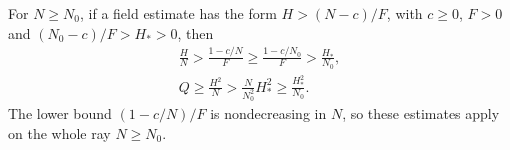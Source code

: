 For $N\ge N_0$, if a field estimate has the form $H>(N-c)/F$,
with $c\ge0$, $F>0$ and $(N_0-c)/F>H_*>0$, then
\begin{equation}\label{lt:energy-ray}
 \begin{gathered}
 \frac HN>\frac{1-c/N}{F}\ge\frac{1-c/N_0}{F}
             >\frac{H_*}{N_0},\\
 Q\ge\frac{H^2}{N}>\frac{N}{N_0^2}H_*^2\ge\frac{H_*^2}{N_0}.
 \end{gathered}
\end{equation}
The lower bound $(1-c/N)/F$ is nondecreasing in $N$, so these
estimates apply on the whole ray $N\ge N_0$.
